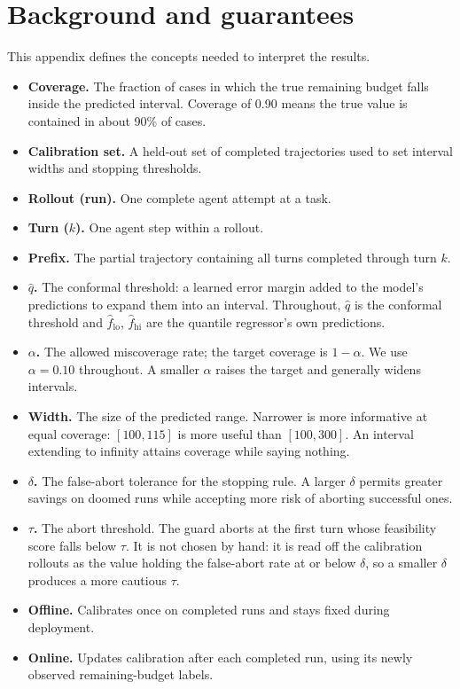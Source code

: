 \documentclass{article}
\begin{document}
\appendix

\section{Background and guarantees}
\label{app:background}

This appendix defines the concepts needed to interpret the results.

\begin{itemize}
  \item \textbf{Coverage.} The fraction of cases in which the true remaining budget
  falls inside the predicted interval. Coverage of 0.90 means the true value is
  contained in about 90\% of cases.
  \item \textbf{Calibration set.} A held-out set of completed trajectories used to set
  interval widths and stopping thresholds.
  \item \textbf{Rollout (run).} One complete agent attempt at a task.
  \item \textbf{Turn ($k$).} One agent step within a rollout.
  \item \textbf{Prefix.} The partial trajectory containing all turns completed through
  turn $k$.
  \item \textbf{$\hat q$.} The conformal threshold: a learned error margin added to the
  model's predictions to expand them into an interval. Throughout, $\hat q$ is the
  conformal threshold and $\hat f_{\mathrm{lo}}$, $\hat f_{\mathrm{hi}}$ are the
  quantile regressor's own predictions.
  \item \textbf{$\alpha$.} The allowed miscoverage rate; the target coverage is
  $1{-}\alpha$. We use $\alpha{=}0.10$ throughout. A smaller $\alpha$ raises the target
  and generally widens intervals.
  \item \textbf{Width.} The size of the predicted range. Narrower is more informative
  at equal coverage: $[100, 115]$ is more useful than $[100, 300]$. An interval
  extending to infinity attains coverage while saying nothing.
  \item \textbf{$\delta$.} The false-abort tolerance for the stopping rule. A larger
  $\delta$ permits greater savings on doomed runs while accepting more risk of aborting
  successful ones.
  \item \textbf{$\tau$.} The abort threshold. The guard aborts at the first turn whose
  feasibility score falls below $\tau$. It is not chosen by hand: it is read off the
  calibration rollouts as the value holding the false-abort rate at or below $\delta$,
  so a smaller $\delta$ produces a more cautious $\tau$.
  \item \textbf{Offline.} Calibrates once on completed runs and stays fixed during
  deployment.
  \item \textbf{Online.} Updates calibration after each completed run, using its newly
  observed remaining-budget labels.
\end{itemize}
\end{document}

